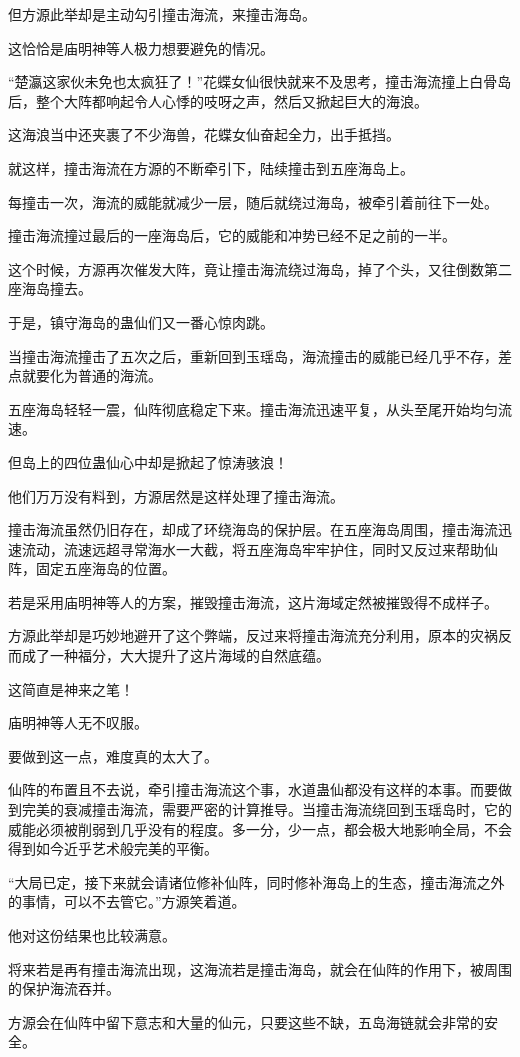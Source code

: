 \begin{this_body}
但方源此举却是主动勾引撞击海流，来撞击海岛。

这恰恰是庙明神等人极力想要避免的情况。

“楚瀛这家伙未免也太疯狂了！”花蝶女仙很快就来不及思考，撞击海流撞上白骨岛后，整个大阵都响起令人心悸的吱呀之声，然后又掀起巨大的海浪。

这海浪当中还夹裹了不少海兽，花蝶女仙奋起全力，出手抵挡。

就这样，撞击海流在方源的不断牵引下，陆续撞击到五座海岛上。

每撞击一次，海流的威能就减少一层，随后就绕过海岛，被牵引着前往下一处。

撞击海流撞过最后的一座海岛后，它的威能和冲势已经不足之前的一半。

这个时候，方源再次催发大阵，竟让撞击海流绕过海岛，掉了个头，又往倒数第二座海岛撞去。

于是，镇守海岛的蛊仙们又一番心惊肉跳。

当撞击海流撞击了五次之后，重新回到玉瑶岛，海流撞击的威能已经几乎不存，差点就要化为普通的海流。

五座海岛轻轻一震，仙阵彻底稳定下来。撞击海流迅速平复，从头至尾开始均匀流速。

但岛上的四位蛊仙心中却是掀起了惊涛骇浪！

他们万万没有料到，方源居然是这样处理了撞击海流。

撞击海流虽然仍旧存在，却成了环绕海岛的保护层。在五座海岛周围，撞击海流迅速流动，流速远超寻常海水一大截，将五座海岛牢牢护住，同时又反过来帮助仙阵，固定五座海岛的位置。

若是采用庙明神等人的方案，摧毁撞击海流，这片海域定然被摧毁得不成样子。

方源此举却是巧妙地避开了这个弊端，反过来将撞击海流充分利用，原本的灾祸反而成了一种福分，大大提升了这片海域的自然底蕴。

这简直是神来之笔！

庙明神等人无不叹服。

要做到这一点，难度真的太大了。

仙阵的布置且不去说，牵引撞击海流这个事，水道蛊仙都没有这样的本事。而要做到完美的衰减撞击海流，需要严密的计算推导。当撞击海流绕回到玉瑶岛时，它的威能必须被削弱到几乎没有的程度。多一分，少一点，都会极大地影响全局，不会得到如今近乎艺术般完美的平衡。

“大局已定，接下来就会请诸位修补仙阵，同时修补海岛上的生态，撞击海流之外的事情，可以不去管它。”方源笑着道。

他对这份结果也比较满意。

将来若是再有撞击海流出现，这海流若是撞击海岛，就会在仙阵的作用下，被周围的保护海流吞并。

方源会在仙阵中留下意志和大量的仙元，只要这些不缺，五岛海链就会非常的安全。

\end{this_body}

